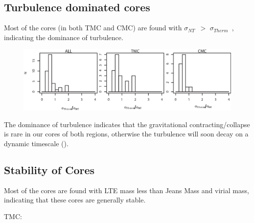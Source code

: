 \documentclass{article}
\newcommand{\sigmath}{$\sigma _{Therm}$\ }
\newcommand{\sigmant}{$\sigma _{NT}$\ }
\begin{document}
    \subsection{Turbulence dominated cores}
Most of the cores (in both TMC and CMC) are found with \sigmant $>$ \sigmath, indicating the dominance of turbulence.
\begin{figure}[H]
          \centering
          \includegraphics[totalheight=34 mm]{VelocityComparison.eps}

       \end{figure}
The dominance of turbulence indicates that the gravitational contracting/collapse is rare in our cores of both regions, otherwise the turbulence will soon decay on a dynamic timescale (\citealt{shu1987star}).

\newpage

    \subsection{Stability of Cores}
    Most of the cores are found with LTE mass less than Jeans Mass and virial mass, indicating that these cores are generally stable.

TMC:
\end{document}

